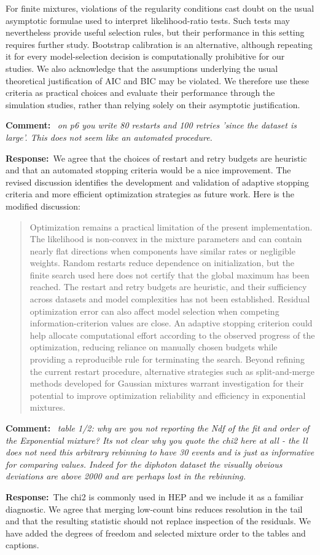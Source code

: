 \documentclass[11pt,a4paper]{article}
\newcommand{\refcomment}[1]{%
    \medskip\noindent\textbf{\color{refcolor}Comment:}\ %
    {\itshape #1}\par\smallskip
}
\newcommand{\response}{\noindent\textbf{Response:}\ }
\newcommand{\addedtext}[1]{%
    \smallskip\begin{quote}\color{quotecolor}\small #1\end{quote}\smallskip
}
\begin{document}
For finite mixtures, violations of the regularity conditions cast doubt on the usual asymptotic formulae used to interpret likelihood-ratio tests. Such tests may nevertheless provide useful selection rules, but their performance in this setting requires further study. Bootstrap calibration is an alternative, although repeating it for every model-selection decision is computationally prohibitive for our studies. We also acknowledge that the assumptions underlying the usual theoretical justification of AIC and BIC may be violated. We therefore use these criteria as practical choices and evaluate their performance through the simulation studies, rather than relying solely on their asymptotic justification.


\refcomment{on p6 you write 80 restarts and 100 retries ’since the dataset is large’. This does not seem like an automated procedure.}
\response We agree that the choices of restart and retry budgets are heuristic and that an automated stopping criteria would be a nice improvement. The revised discussion identifies the development and validation of adaptive stopping criteria and more efficient optimization strategies as future work. Here is the modified discussion:
\addedtext{Optimization remains a practical limitation of the present implementation. The likelihood is non-convex in the mixture parameters and can contain nearly flat directions when components have similar rates or negligible weights. Random restarts reduce dependence on initialization, but the finite search used here does not certify that the global maximum has been reached. The restart and retry budgets are heuristic, and their sufficiency across datasets and model complexities has not been established. Residual optimization error can also affect model selection when competing information-criterion values are close. An adaptive stopping criterion could help allocate computational effort according to the observed progress of the optimization, reducing reliance on manually chosen budgets while providing a reproducible rule for terminating the search. Beyond refining the current restart procedure, alternative strategies such as split-and-merge methods developed for Gaussian mixtures \cite{split-and-merge} warrant investigation for their potential to improve optimization reliability and efficiency in exponential mixtures.}

\refcomment{table 1/2: why are you not reporting the Ndf of the fit and order of
the Exponential mixture? Its not clear why you quote the chi2 here at
all - the ll does not need this arbitrary rebinning to have 30 events and is
just as informative for comparing values. Indeed for the diphoton dataset the visually obvious deviations are above 2000 and are perhaps lost in the rebinning.}
\response The chi2 is commonly used in HEP and we include it as a familiar diagnostic. We agree that merging low-count bins reduces resolution in the tail and that the resulting statistic should not replace inspection of the residuals. We have added the degrees of freedom and selected mixture order to the tables and captions.
\end{document}
